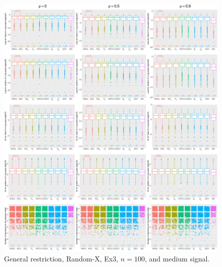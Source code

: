 \clearpage
\begin{figure}[!ht]
\centering
\includegraphics[width=\textwidth]{figures/supplement/randomx/general_restriction/Ex3_n100_msnr.eps}
\caption{General restriction, Random-X, Ex3, $n=100$, and medium signal.}
\end{figure}
\clearpage
